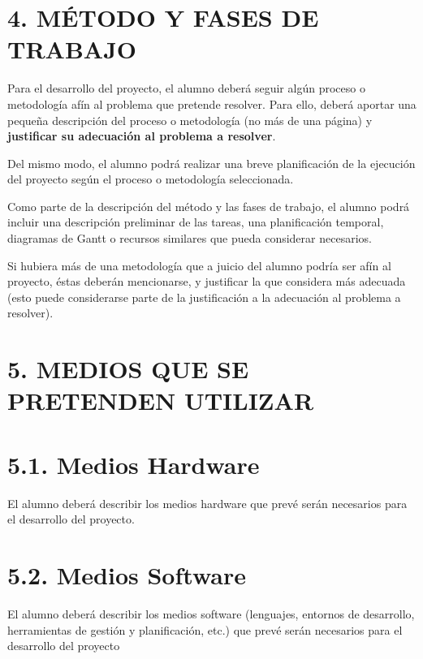 \documentclass[a4paper]{article}
\begin{document}
\section[4. M\'ETODO Y FASES DE TRABAJO]{4. M\'ETODO Y FASES DE TRABAJO}

\bigskip

Para el desarrollo del proyecto, el alumno deber\'a seguir alg\'un proceso o metodolog\'ia af\'in al problema que
pretende resolver. Para ello, deber\'a aportar una peque\~na descripci\'on del proceso o metodolog\'ia (no m\'as de una
p\'agina) y \textbf{justificar su adecuaci\'on al problema a resolver}.

Del mismo modo, el alumno podrá realizar una breve planificaci\'on de la ejecuci\'on del proyecto seg\'un el proceso
o metodolog\'ia seleccionada.

Como parte de la descripci\'on del m\'etodo y las fases de trabajo, el alumno podr\'a incluir una descripci\'on
preliminar de las tareas, una planificaci\'on temporal, diagramas de Gantt o recursos similares que pueda considerar
necesarios.

Si hubiera m\'as de una metodolog\'ia que a juicio del alumno podr\'ia ser af\'in al proyecto, \'estas deber\'an
mencionarse, y justificar la que considera m\'as adecuada (esto puede considerarse parte de la justificaci\'on a la
adecuaci\'on al problema a resolver).

\section{5. MEDIOS QUE SE PRETENDEN UTILIZAR}
\section{5.1. Medios Hardware}

El alumno deber\'a describir los medios hardware que prev\'e ser\'an necesarios para el desarrollo del proyecto.

\section{5.2. Medios Software}

El alumno deber\'a describir los medios software (lenguajes, entornos de desarrollo, herramientas de gesti\'on y
planificaci\'on, etc.) que prev\'e ser\'an necesarios para el desarrollo del proyecto

\end{document}
